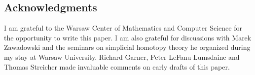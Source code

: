 \documentclass{tac}
\begin{document}
\subsection*{Acknowledgments} 
I am grateful to the Warsaw Center of Mathematics and Computer Science for the opportunity to write this paper. I am also grateful for discussions with Marek Zawadowski and the seminars on simplicial homotopy theory he organized during my stay at Warsaw University. Richard Garner, Peter LeFanu Lumsdaine and Thomas Streicher made invaluable comments on early drafts of this paper.



\printbibliography
\end{document}
